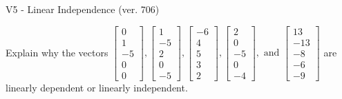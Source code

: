 \begin{exercise}
  \begin{exerciseTitle}V5 - Linear Independence (ver. 706)\end{exerciseTitle}
  \begin{exerciseStatement}
    Explain why the vectors \(\left[\begin{array}{r}
0 \\
1 \\
-5 \\
0 \\
0
\end{array}\right] , \left[\begin{array}{r}
1 \\
-5 \\
2 \\
0 \\
-5
\end{array}\right] , \left[\begin{array}{r}
-6 \\
4 \\
5 \\
3 \\
2
\end{array}\right] , \left[\begin{array}{r}
2 \\
0 \\
-5 \\
0 \\
-4
\end{array}\right] , \text{ and } \left[\begin{array}{r}
13 \\
-13 \\
-8 \\
-6 \\
-9
\end{array}\right]\) are linearly dependent or linearly independent.	



\end{exerciseStatement}
\end{exercise}
